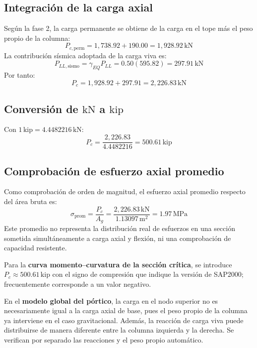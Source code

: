 \documentclass[11pt,a4paper]{article}
\begin{document}
\subsection{Integración de la carga axial}
Según la fase 2, la carga permanente se obtiene de la carga en el tope
más el peso propio de la columna:
\begin{equation*}
P_{c,\mathrm{perm}}=1{,}738.92+190.00
=1{,}928.92\,\mathrm{kN}
\end{equation*}
La contribución sísmica adoptada de la carga viva es:
\begin{equation*}
P_{LL,\mathrm{sismo}}=\gamma_{EQ}P_{LL}
=0.50(595.82)=\boxed{297.91\,\mathrm{kN}}
\end{equation*}
Por tanto:
\begin{equation*}
P_c=1{,}928.92+297.91=\boxed{2{,}226.83\,\mathrm{kN}}
\end{equation*}

\subsection{Conversión de $\mathrm{kN}$ a $\mathrm{kip}$}
Con $1\,\mathrm{kip}=4.4482216\,\mathrm{kN}$:
\begin{equation*}
P_c=\frac{2{,}226.83}{4.4482216}
=\boxed{500.61\,\mathrm{kip}}
\end{equation*}

\subsection{Comprobación de esfuerzo axial promedio}
Como comprobación de orden de magnitud, el esfuerzo axial promedio
respecto del área bruta es:
\begin{equation*}
\sigma_{\mathrm{prom}}=\frac{P_c}{A_g}
=\frac{2{,}226.83\,\mathrm{kN}}{1.13097\,\mathrm{m}^2}
=\boxed{1.97\,\mathrm{MPa}}
\end{equation*}
Este promedio no representa la distribución real de esfuerzos en una
sección sometida simultáneamente a carga axial y flexión, ni una
comprobación de capacidad resistente.

\begin{tcolorbox}[title={Distinción entre análisis de sección y modelo global}]
Para la \textbf{curva momento--curvatura de la sección crítica}, se introduce
$P_c\approx500.61\,\mathrm{kip}$ con el signo de compresión que indique
la versión de SAP2000; frecuentemente corresponde a un valor negativo.

En el \textbf{modelo global del pórtico}, la carga en el nodo superior no
es necesariamente igual a la carga axial de base, pues el peso propio
de la columna ya interviene en el caso gravitacional. Además, la
reacción de carga viva puede distribuirse de manera diferente entre
la columna izquierda y la derecha. Se verifican por separado las
reacciones y el peso propio automático.
\end{tcolorbox}
\end{document}
